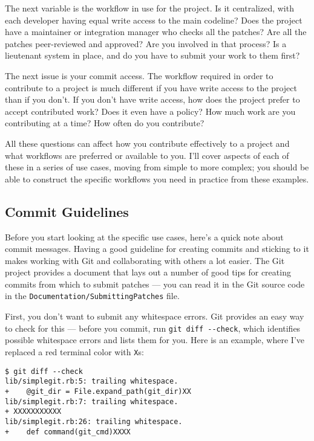 \documentclass[a4paper]{book}
\begin{document}
The next variable is the workflow in use for the project. Is it centralized, with each developer having equal write access to the main codeline? Does the project have a maintainer or integration manager who checks all the patches? Are all the patches peer-reviewed and approved? Are you involved in that process? Is a lieutenant system in place, and do you have to submit your work to them first?

The next issue is your commit access. The workflow required in order to contribute to a project is much different if you have write access to the project than if you don't. If you don't have write access, how does the project prefer to accept contributed work? Does it even have a policy? How much work are you contributing at a time? How often do you contribute?

All these questions can affect how you contribute effectively to a project and what workflows are preferred or available to you. I'll cover aspects of each of these in a series of use cases, moving from simple to more complex; you should be able to construct the specific workflows you need in practice from these examples.

\subsection{Commit Guidelines}

Before you start looking at the specific use cases, here's a quick note about commit messages. Having a good guideline for creating commits and sticking to it makes working with Git and collaborating with others a lot easier. The Git project provides a document that lays out a number of good tips for creating commits from which to submit patches --- you can read it in the Git source code in the \texttt{Documentation/SubmittingPatches} file.

First, you don't want to submit any whitespace errors. Git provides an easy way to check for this --- before you commit, run \texttt{git diff -{}-check}, which identifies possible whitespace errors and lists them for you. Here is an example, where I've replaced a red terminal color with \texttt{X}s:

\begin{shaded}\begin{verbatim}
$ git diff --check
lib/simplegit.rb:5: trailing whitespace.
+    @git_dir = File.expand_path(git_dir)XX
lib/simplegit.rb:7: trailing whitespace.
+ XXXXXXXXXXX
lib/simplegit.rb:26: trailing whitespace.
+    def command(git_cmd)XXXX
\end{verbatim}\end{shaded}
\end{document}
